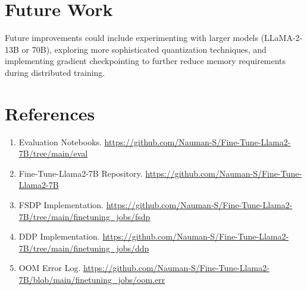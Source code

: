 \documentclass{assignment7_report}
\begin{document}
\section{Future Work}
\vspace*{-3mm}

Future improvements could include experimenting with larger models (LLaMA-2-13B or 70B), exploring more sophisticated quantization techniques, and implementing gradient checkpointing to further reduce memory requirements during distributed training.




\section*{References}
\begin{enumerate}
\item \label{eval_notebooks} Evaluation Notebooks. \url{https://github.com/Nauman-S/Fine-Tune-Llama2-7B/tree/main/eval}
\item \label{github_repo} Fine-Tune-Llama2-7B Repository. \url{https://github.com/Nauman-S/Fine-Tune-Llama2-7B}
\item \label{fsdp_implementation} FSDP Implementation. \url{https://github.com/Nauman-S/Fine-Tune-Llama2-7B/tree/main/finetuning\_jobs/fsdp}
\item \label{ddp_implementation} DDP Implementation. \url{https://github.com/Nauman-S/Fine-Tune-Llama2-7B/tree/main/finetuning\_jobs/ddp}
\item \label{oom_error_log} OOM Error Log. \url{https://github.com/Nauman-S/Fine-Tune-Llama2-7B/blob/main/finetuning\_jobs/oom.err}
\end{enumerate}




\end{document}
